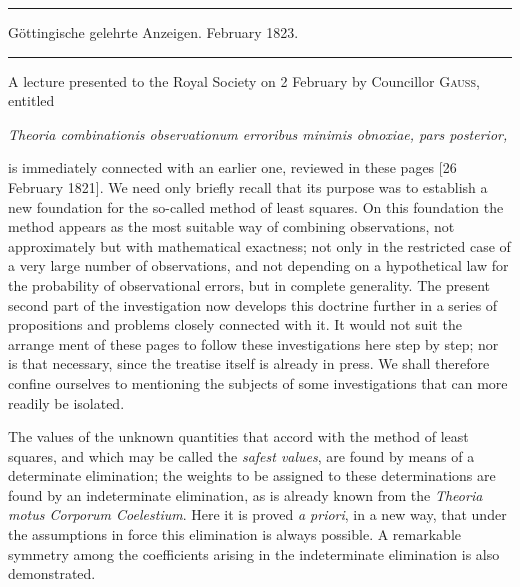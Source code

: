 \par\bigskip
\begin{center}
\rule{.88\textwidth}{.3pt}\par
Göttingische gelehrte Anzeigen. February 1823.\par
\rule{.88\textwidth}{.3pt}
\end{center}

A lecture presented to the Royal Society on 2 February by Councillor \textsc{Gauss}, entitled
\begin{center}
\textit{Theoria combinationis observationum erroribus minimis obnoxiae, pars posterior,}
\end{center}
\noindent is immediately connected with an earlier one, reviewed in these pages [26 February 1821]. We need only briefly recall that its purpose was to establish a new foundation for the so-called method of least squares. On this foundation the method appears as the most suitable way of combining observations, not approximately but with mathematical exactness; not only in the restricted case of a very large number of observations, and not depending on a hypothetical law for the probability of observational errors, but in complete generality. The present second part of the investigation now develops this doctrine further in a series of propositions and problems closely connected with it. It would not suit the arrange%
ment of these pages to follow these investigations here step by step; nor is that necessary, since the treatise itself is already in press. We shall therefore confine ourselves to mentioning the subjects of some investigations that can more readily be isolated.

The values of the unknown quantities that accord with the method of least squares, and which may be called the \textit{safest values}, are found by means of a determinate elimination; the weights to be assigned to these determinations are found by an indeterminate elimination, as is already known from the \textit{Theoria motus Corporum Coelestium}. Here it is proved \textit{a priori}, in a new way, that under the assumptions in force this elimination is always possible. A remarkable symmetry among the coefficients arising in the indeterminate elimination is also demonstrated.

